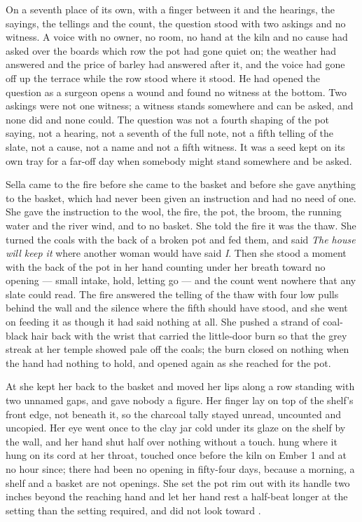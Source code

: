 On a seventh place of its own, with a finger between it and the hearings, the sayings, the tellings and the count, the question stood with two askings and no witness. A voice with no owner, no room, no hand at the kiln and no cause had asked over the boards which row the pot had gone quiet on; the weather had answered and the price of barley had answered after it, and the voice had gone off up the terrace while the row stood where it stood. He had opened the question as a surgeon opens a wound and found no witness at the bottom. Two askings were not one witness; a witness stands somewhere and can be asked, and none did and none could. The question was not a fourth shaping of the pot saying, not a hearing, not a seventh of the full note, not a fifth telling of the slate, not a cause, not a name and not a fifth witness. It was a seed kept on its own tray for a far-off day when somebody might stand somewhere and be asked.

\scenebreak

Sella came to the fire before she came to the basket and before she gave anything to the basket, which had never been given an instruction and had no need of one. She gave the instruction to the wool, the fire, the pot, the broom, the running water and the river wind, and to no basket. She told the fire it was the thaw. She turned the coals with the back of a broken pot and fed them, and said \emph{The house will keep it} where another woman would have said \emph{I}. Then she stood a moment with the back of the pot in her hand counting under her breath toward no opening --- small intake, hold, letting go --- and the count went nowhere that any slate could read. The fire answered the telling of the thaw with four low pulls behind the wall and the silence where the fifth should have stood, and she went on feeding it as though it had said nothing at all. She pushed a strand of coal-black hair back with the wrist that carried the little-door burn so that the grey streak at her temple showed pale off the coals; the burn closed on nothing when the hand had nothing to hold, and opened again as she reached for the pot.

At  she kept her back to the basket and moved her lips along a row standing with two unnamed gaps, and gave nobody a figure. Her finger lay on top of the shelf's front edge, not beneath it, so the charcoal tally stayed unread, uncounted and uncopied. Her eye went once to the clay jar cold under its glaze on the shelf by the wall, and her hand shut half over nothing without a touch.  hung where it hung on its cord at her throat, touched once before the kiln on Ember 1 and at no hour since; there had been no opening in fifty-four days, because a morning, a shelf and a basket are not openings. She set the pot rim out with its handle two inches beyond the reaching hand and let her hand rest a half-beat longer at the setting than the setting required, and did not look toward .

